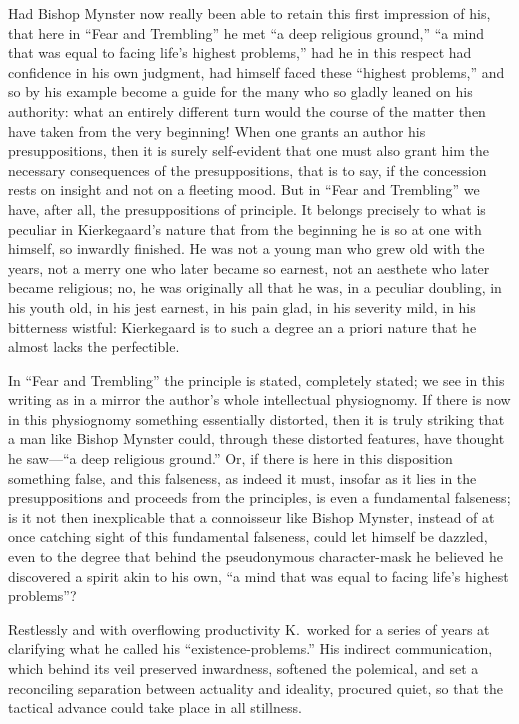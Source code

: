 \documentclass[12pt,a4paper]{article}
\newcommand{\opage}[1]{\marginnote{\footnotesize\textit{[#1]}}}
\begin{document}
Had Bishop Mynster now really been able to retain
this first impression of his, that here in ``Fear and Trembling''
he met ``a deep religious ground,''
``a mind that was equal to facing life's highest problems,''
had he in this respect had confidence in his
own judgment, had himself faced these ``highest problems,''
and so by his example become a guide
for the many who so gladly leaned on
his authority: what an entirely different turn would the course of the matter
then have taken from the very beginning!
When one grants an author his presuppositions,
then it is surely self-evident that one must also grant
him the necessary consequences of the presuppositions, that is to say,
if the concession rests on insight and not on a
fleeting mood. But in ``Fear and Trembling'' we have, after all,
the presuppositions of principle. It belongs precisely to
what is peculiar in Kierkegaard's nature that from
the beginning he is so at one with himself, so inwardly
finished. He was not a young man who grew old with the years,
not a merry one who later became so earnest,
not an aesthete who later became religious; no,
he was originally all that he was, in a peculiar
doubling, in his youth old, in his jest earnest,
in his pain glad, in his severity mild, in his
bitterness wistful: Kierkegaard is to such a degree an a priori
nature that he almost lacks the perfectible.

In ``Fear and Trembling'' the principle is stated, completely
stated; we see in this writing as in a mirror the author's whole intellectual
physiognomy. If there is now in this physiognomy
something essentially distorted, then it is truly striking
that a man like Bishop Mynster could, through these distorted
features, have thought he saw---``a deep religious
ground.'' Or, if there is here in this disposition something false,
and this falseness, as indeed it must, insofar as it
\opage{8}
lies in the presuppositions and proceeds from the principles,
is even a fundamental falseness; is it not then inexplicable that
a connoisseur like Bishop Mynster, instead of at once catching
sight of this fundamental falseness, could let himself be dazzled,
even to the degree that behind the pseudonymous character-mask
he believed he discovered a spirit akin to
his own, ``a mind that was equal to facing life's
highest problems''?

Restlessly and with overflowing productivity K.\ worked
for a series of years at clarifying what he called
his ``existence-problems.'' His indirect communication,
which behind its veil preserved inwardness, softened the
polemical, and set a reconciling separation between actuality
and ideality, procured quiet, so that the tactical
advance could take place in all stillness.
\end{document}

